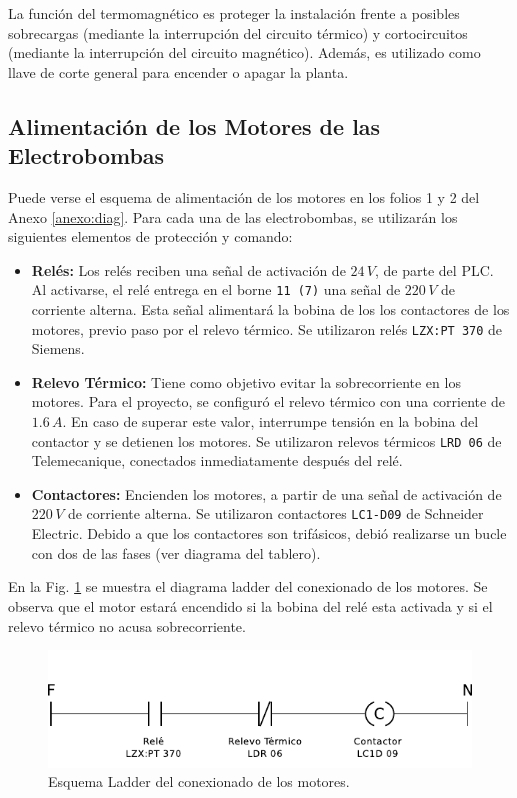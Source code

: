 La función del termomagnético es proteger la instalación frente a posibles
sobrecargas (mediante la interrupción del circuito térmico) y cortocircuitos
(mediante la interrupción del circuito magnético).
Además, es utilizado como llave de corte general para encender o apagar la
planta.

\subsection{Alimentación de los Motores de las Electrobombas}
\label{subsec:alimentacionMotores}
Puede verse el esquema de alimentación de los motores en los folios 1 y 2 del
Anexo \ref{anexo:diag}.
Para cada una de las electrobombas, se utilizarán los siguientes elementos de
protección y comando:
\begin{itemize}
 \item \textbf{Relés:}
 Los relés reciben una señal de activación de $24\,V$, de parte del PLC.
 Al activarse, el relé entrega en el borne \verb|11 (7)| una señal de $220\,V$
de corriente alterna.
Esta señal alimentará la bobina de los los contactores de los motores, previo 
paso por el relevo térmico. Se utilizaron relés \verb|LZX:PT 370| de Siemens.
 \item \textbf{Relevo Térmico:}
 Tiene como objetivo evitar la sobrecorriente en los motores.
 Para el proyecto, se configuró el relevo térmico con una corriente
 de $1.6\,A$.
 En caso de superar este valor, interrumpe tensión en la bobina
 del contactor y se detienen los motores.
 Se utilizaron relevos térmicos \verb|LRD 06| de Telemecanique, conectados
inmediatamente después del relé.
 \item \textbf{Contactores:}
 Encienden los motores, a partir de una señal de activación de $220\,V$ de
corriente alterna.
Se utilizaron contactores \verb|LC1-D09| de Schneider Electric.
Debido a que los contactores son trifásicos, debió realizarse un bucle con dos
de las fases (ver diagrama del tablero).
\end{itemize}

En la Fig. \ref{fig:diagramaLadderContactor} se muestra el diagrama ladder
del conexionado de los motores.
Se observa que  el motor estará encendido si la bobina del relé esta activada y
si el relevo térmico no acusa sobrecorriente.

\begin{figure}
 \centering
 \includegraphics[scale=1.1]{Cap3-TableroElectrico/Images/ladderConexion.pdf}
 \caption{Esquema Ladder del conexionado de los motores.}
 \label{fig:diagramaLadderContactor}
\end{figure}


